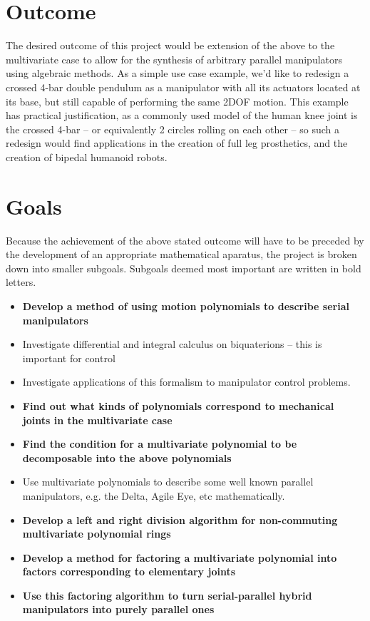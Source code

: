 \section{Outcome}
The desired outcome of this project would be extension of the above to the multivariate case to allow for the synthesis of arbitrary parallel manipulators using algebraic methods.
As a simple use case example, we'd like to redesign a crossed 4-bar double pendulum as a manipulator with all its actuators located at its base, but still capable of performing the same 2DOF motion. This example has practical justification, as a commonly used model of the human knee joint is the crossed 4-bar -- or equivalently 2 circles rolling on each other -- so such a redesign would find applications in the creation of full leg prosthetics, and the creation of bipedal humanoid robots.
\section{Goals}
Because the achievement of the above stated outcome will have to be preceded by the development of an appropriate mathematical aparatus, the project is broken down into smaller subgoals. Subgoals deemed most important are written in bold letters.
\begin{itemize}
    \item \textbf{Develop a method of using motion polynomials to describe serial manipulators}
    \item Investigate differential and integral calculus on biquaterions -- this is important for control
    \item Investigate applications of this formalism to manipulator control problems. 
    \item \textbf{Find out what kinds of polynomials correspond to mechanical joints in the multivariate case}
    \item \textbf{Find the condition for a multivariate polynomial to be decomposable into the above polynomials}
    \item Use multivariate polynomials to describe some well known parallel manipulators, e.g. the Delta, Agile Eye, etc mathematically.
    \item \textbf{Develop a left and right division algorithm for non-commuting multivariate polynomial rings}
    \item \textbf{Develop a method for factoring a multivariate polynomial into factors corresponding to elementary joints}
    \item \textbf{Use this factoring algorithm to turn serial-parallel hybrid manipulators into purely parallel ones}
\end{itemize}
